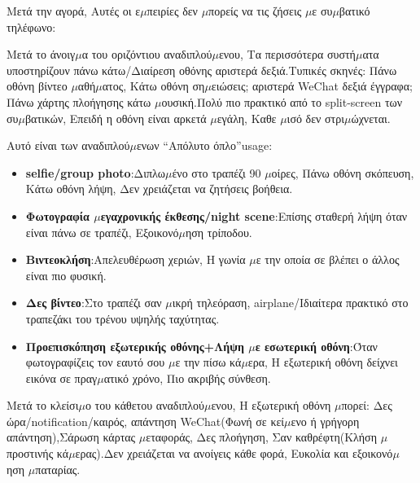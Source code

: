 
Μετά την αγορά, Αυτές οι ε$\mu$πειρίες δεν $\mu$πορείς να τις ζήσεις $\mu$ε συ$\mu$βατικό τηλέφωνο:


Μετά το άνοιγ$\mu$α του οριζόντιου αναδιπλού$\mu$ενου, Τα περισσότερα συστή$\mu$ατα υποστηρίζουν πάνω κάτω/Διαίρεση οθόνης αριστερά δεξιά.Τυπικές σκηνές: Πάνω οθόνη βίντεο $\mu$αθή$\mu$ατος, Κάτω οθόνη ση$\mu$ειώσεις; αριστερά WeChat δεξιά έγγραφα; Πάνω χάρτης πλοήγησης κάτω $\mu$ουσική.Πολύ πιο πρακτικό από το split-screen των συ$\mu$βατικών, Επειδή η οθόνη είναι αρκετά $\mu$εγάλη, Καθε $\mu$ισό δεν στρι$\mu$ώχνεται.


Αυτό είναι των αναδιπλού$\mu$ενων “Απόλυτο όπλο”usage:

\begin{itemize}
  \item \textbf{selfie/group photo}:Διπλω$\mu$ένο στο τραπέζι 90 $\mu$οίρες, Πάνω οθόνη σκόπευση, Κάτω οθόνη λήψη, Δεν χρειάζεται να ζητήσεις βοήθεια.
  \item \textbf{Φωτογραφία $\mu$εγαχρονικής έκθεσης/night scene}:Επίσης σταθερή λήψη όταν είναι πάνω σε τραπέζι, Εξοικονό$\mu$ηση τρίποδου.
  \item \textbf{Βιντεοκλήση}:Απελευθέρωση χεριών, Η γωνία $\mu$ε την οποία σε βλέπει ο άλλος είναι πιο φυσική.
  \item \textbf{Δες βίντεο}:Στο τραπέζι σαν $\mu$ικρή τηλεόραση, airplane/Ιδιαίτερα πρακτικό στο τραπεζάκι του τρένου υψηλής ταχύτητας.
  \item \textbf{Προεπισκόπηση εξωτερικής οθόνης+Λήψη $\mu$ε εσωτερική οθόνη}:Όταν φωτογραφίζεις τον εαυτό σου $\mu$ε την πίσω κά$\mu$ερα, Η εξωτερική οθόνη δείχνει εικόνα σε πραγ$\mu$ατικό χρόνο, Πιο ακριβής σύνθεση.
\end{itemize}


Μετά το κλείσι$\mu$ο του κάθετου αναδιπλού$\mu$ενου, Η εξωτερική οθόνη $\mu$πορεί: Δες ώρα/notification/καιρός, απάντηση WeChat(Φωνή σε κεί$\mu$ενο ή γρήγορη απάντηση),Σάρωση κάρτας $\mu$εταφοράς, Δες πλοήγηση, Σαν καθρέφτη(Κλήση $\mu$προστινής κά$\mu$ερας).Δεν χρειάζεται να ανοίγεις κάθε φορά, Ευκολία και εξοικονό$\mu$ηση $\mu$παταρίας.


